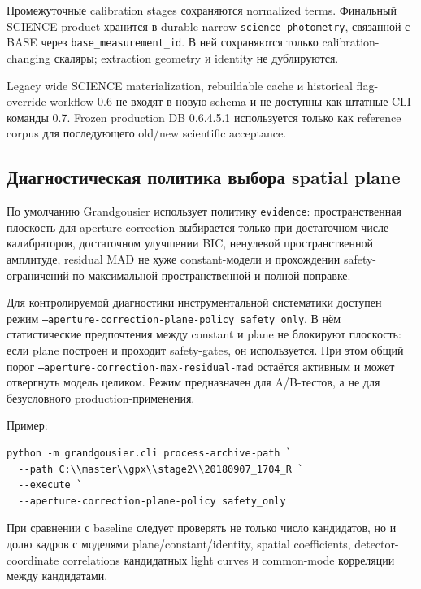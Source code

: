 Промежуточные calibration stages сохраняются normalized terms. Финальный SCIENCE
product хранится в durable narrow \texttt{science\_photometry}, связанной с BASE
через \texttt{base\_measurement\_id}. В ней сохраняются только calibration-changing
скаляры; extraction geometry и identity не дублируются.

Legacy wide SCIENCE materialization, rebuildable cache и historical flag-override
workflow 0.6 не входят в новую schema и не доступны как штатные CLI-команды 0.7.
Frozen production DB 0.6.4.5.1 используется только как reference corpus для
последующего old/new scientific acceptance.

\subsection{Диагностическая политика выбора spatial plane}
\label{sec:aperture-plane-policy}

По умолчанию Grandgousier использует политику \texttt{evidence}: пространственная плоскость
для aperture correction выбирается только при достаточном числе калибраторов, достаточном
улучшении BIC, ненулевой пространственной амплитуде, residual MAD не хуже constant-модели
и прохождении safety-ограничений по максимальной пространственной и полной поправке.

Для контролируемой диагностики инструментальной систематики доступен режим
\texttt{--aperture-correction-plane-policy safety\_only}. В нём статистические предпочтения
между constant и plane не блокируют плоскость: если plane построен и проходит safety-gates,
он используется. При этом общий порог \texttt{--aperture-correction-max-residual-mad}
остаётся активным и может отвергнуть модель целиком. Режим предназначен для A/B-тестов,
а не для безусловного production-применения.

Пример:
\begin{verbatim}
python -m grandgousier.cli process-archive-path `
  --path C:\\master\\gpx\\stage2\\20180907_1704_R `
  --execute `
  --aperture-correction-plane-policy safety_only
\end{verbatim}

При сравнении с baseline следует проверять не только число кандидатов, но и долю кадров
с моделями plane/constant/identity, spatial coefficients, detector-coordinate correlations
кандидатных light curves и common-mode корреляции между кандидатами.


